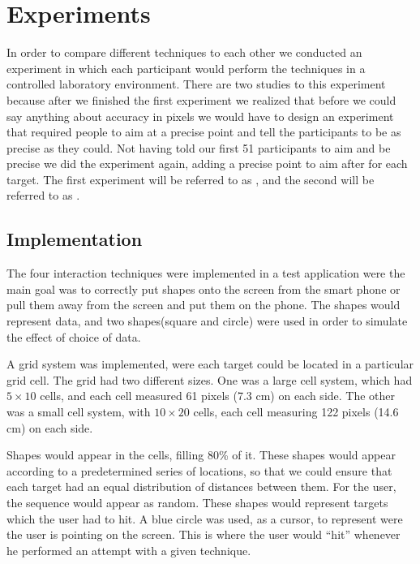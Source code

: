 \section{Experiments} \label{sec:experiment}
In order to compare  different techniques to each other we conducted an experiment in which each participant would perform the techniques in a controlled laboratory environment.
There are two studies to this experiment because after we finished the first experiment we realized that before we could say anything about accuracy in pixels we would have to design an experiment that required people to aim at a precise point and tell the participants to be as precise as they could.
Not having told our first 51 participants to aim and be precise we did the experiment again, adding a precise point to aim after for each target.
The first  experiment will be referred to as \target, and the second will be referred to as \accuracy.

\subsection{Implementation}
The four interaction techniques were implemented in a test application were the main goal was to correctly put shapes onto the screen from the smart phone or pull them away from the screen and put them on the phone.
The shapes would represent data, and two shapes(square and circle) were used in order to simulate the effect of choice of data. 

A grid system was implemented, were each target could be located in a particular grid cell.
The grid had two different sizes.
One was a large cell system, which had $5\times10$ cells, and each cell measured 61 pixels (7.3 cm) on each side.
The other was a small cell system, with $10\times20$ cells, each cell measuring 122 pixels (14.6 cm)  on each side. 

Shapes would appear in the cells, filling 80\% of it. 
These shapes would appear according to a predetermined series of locations, so that we could ensure that each target had an equal distribution of distances between them. 
For the user, the sequence would appear as random. 
These shapes would represent targets which the user had to hit.
A blue circle was used, as a cursor, to represent were the user is pointing on the screen.
This is where the user would ``hit'' whenever he performed an attempt with a given technique.


